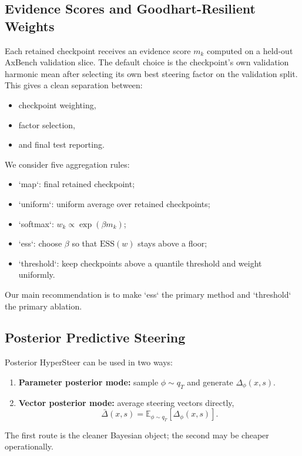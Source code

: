 \documentclass[10pt]{article}
\newcommand{\E}{\mathbb{E}}
\newcommand{\ESS}{\mathrm{ESS}}
\begin{document}
\subsection{Evidence Scores and Goodhart-Resilient Weights}

Each retained checkpoint receives an evidence score $m_k$ computed on a held-out AxBench validation slice. The default choice is the checkpoint’s own validation harmonic mean after selecting its own best steering factor on the validation split. This gives a clean separation between:
\begin{itemize}[leftmargin=1.5em]
  \item checkpoint weighting,
  \item factor selection,
  \item and final test reporting.
\end{itemize}

We consider five aggregation rules:
\begin{itemize}[leftmargin=1.5em]
  \item `map`: final retained checkpoint;
  \item `uniform`: uniform average over retained checkpoints;
  \item `softmax`: $w_k \propto \exp(\beta m_k)$;
  \item `ess`: choose $\beta$ so that $\ESS(w)$ stays above a floor;
  \item `threshold`: keep checkpoints above a quantile threshold and weight uniformly.
\end{itemize}
Our main recommendation is to make `ess` the primary method and `threshold` the primary ablation.

\subsection{Posterior Predictive Steering}

Posterior HyperSteer can be used in two ways:
\begin{enumerate}[leftmargin=1.5em]
  \item \textbf{Parameter posterior mode:} sample $\phi \sim q_T$ and generate $\Delta_\phi(x,s)$.
  \item \textbf{Vector posterior mode:} average steering vectors directly,
  \begin{equation}
  \bar{\Delta}(x,s) = \E_{\phi \sim q_T}[\Delta_\phi(x,s)].
  \end{equation}
\end{enumerate}
The first route is the cleaner Bayesian object; the second may be cheaper operationally.
\end{document}

